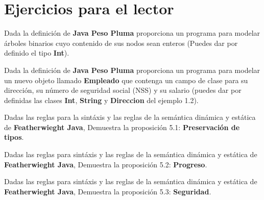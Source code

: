 \section{Ejercicios para el lector}

\begin{exercise}
    Dada la definición de \textbf{Java Peso Pluma} proporciona un programa para modelar árboles binarios cuyo contenido de sus nodos sean enteros (Puedes dar por definido el tipo \textbf{Int}).
\end{exercise}

\bigskip

\begin{exercise}
    Dada la definición de \textbf{Java Peso Pluma} proporciona un programa para modelar un nuevo objeto llamado \textbf{Empleado} que contenga un campo de clase para su dirección, su número de seguridad social (NSS) y su salario (puedes dar por definidas las clases \textbf{Int}, \textbf{String} y \textbf{Direccion} del ejemplo 1.2).
\end{exercise}

\bigskip

\begin{exercise}
    Dadas las reglas para la sintáxis y las reglas de la semántica dinámica y estática de \textbf{Featherwieght Java}, Demuestra la proposición 5.1: \textbf{Preservación de tipos}.
\end{exercise}

\bigskip

\begin{exercise}
   Dadas las reglas para sintáxis y las reglas de la semántica dinámica y estática de \textbf{Featherwieght Java}, Demuestra la proposición 5.2: \textbf{Progreso}.
\end{exercise}

\bigskip

\begin{exercise}
   Dadas las reglas para sintáxis y las reglas de la semántica dinámica y estática de \textbf{Featherwieght Java}, Demuestra la proposición 5.3: \textbf{Seguridad}.
\end{exercise}